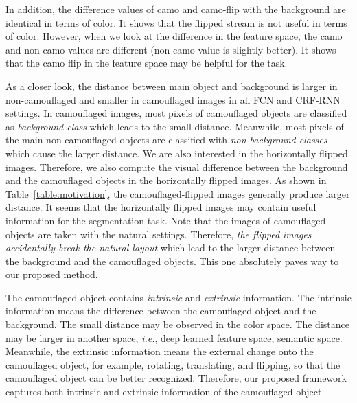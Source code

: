 \documentclass[journal]{IEEEtran}
\begin{document}
In addition, the difference values of camo and camo-flip with the background are identical in terms of color. It shows that the flipped stream is not useful in terms of color. However, when we look at the difference in the feature space, the camo and non-camo values are different (non-camo value is slightly better). It shows that the camo flip in the feature space may be helpful for the task. 

As a closer look, the distance between main object and background is larger in non-camouflaged and smaller in camouflaged images in all FCN and CRF-RNN settings. In camouflaged images, most pixels of camouflaged objects are classified as \textit{background class} which leads to the small distance. Meanwhile, most pixels of the main non-camouflaged objects are classified with \textit{non-background classes} which cause the larger distance. We are also interested in the horizontally flipped images. Therefore, we also compute the visual difference between the background and the camouflaged objects in the horizontally flipped images. As shown in Table~\ref{table:motivation}, the camouflaged-flipped images generally produce larger distance. It seems that the horizontally flipped images may contain useful information for the segmentation task. Note that the images of camouflaged objects are taken with the natural settings. Therefore, \textit{the flipped images accidentally break the natural layout} which lead to the larger distance between the background and the camouflaged objects. This one absolutely paves way to our proposed method.










The camouflaged object contains \textit{intrinsic} and \textit{extrinsic} information. The intrinsic information means the difference between the camouflaged object and the background. The small distance may be observed in the color space. The distance may be larger in another space, \textit{i.e.}, deep learned feature space, semantic space. Meanwhile, the extrinsic information means the external change onto the camouflaged object, for example, rotating, translating, and flipping, so that the camouflaged object can be better recognized. Therefore, our proposed framework captures both intrinsic and extrinsic information of the camouflaged object.
\end{document}
